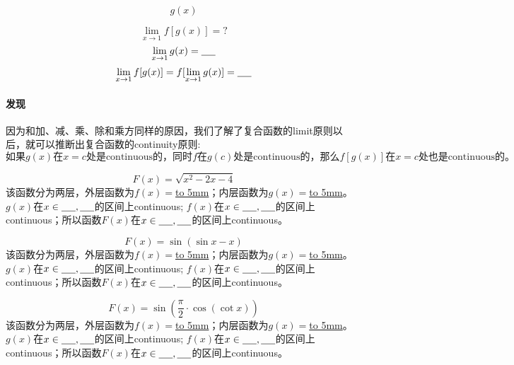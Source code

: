 \documentclass[UTF8]{ctexart}
\begin{document}
\begin{center}
\[g(x)\]
\end{center}

\[{\lim_{x \to 1} f[g(x)]} = ?\]
\[{\lim_{x \to 1} g(x) = \underline{\hbox to 5mm{}}}\]
\[{\lim_{x \to 1} f[g(x)]} = f[{\lim_{x \to 1} g(x)}] = \underline{\hbox to 5mm{}}\]

\paragraph{发现}
因为和加、减、乘、除和乘方同样的原因，我们了解了复合函数的limit原则以后，就可以推断出复合函数的continuity原则:
\[\text{如果} g(x)\text{在}x = c\text{处是continuous的，同时}f\text{在}g(c)\text{处是continuous的，那么}f[g(x)]\text{在}x = c\text{处也是continuous的。}\]

\[F(x) = \sqrt{x^2-2x-4}\]
该函数分为两层，外层函数为$f(x) = $\underline{\hbox to 5mm{}}；内层函数为$g(x) = $\underline{\hbox to 5mm{}}。$g(x)$在$x \in \underline{\hbox to 5mm{}},\underline{\hbox to 5mm{}}$的区间上continuous; $f(x)$在$x \in \underline{\hbox to 5mm{}},\underline{\hbox to 5mm{}}$的区间上continuous；所以函数$F(x)$在$x \in \underline{\hbox to 5mm{}},\underline{\hbox to 5mm{}}$的区间上continuous。

 \[F(x) = \sin{(\sin{x} -x)}\]
该函数分为两层，外层函数为$f(x) = $\underline{\hbox to 5mm{}}；内层函数为$g(x) = $\underline{\hbox to 5mm{}}。$g(x)$在$x \in \underline{\hbox to 5mm{}},\underline{\hbox to 5mm{}}$的区间上continuous; $f(x)$在$x \in \underline{\hbox to 5mm{}},\underline{\hbox to 5mm{}}$的区间上continuous；所以函数$F(x)$在$x \in \underline{\hbox to 5mm{}},\underline{\hbox to 5mm{}}$的区间上continuous。

\[F(x) = \sin{(\frac{\pi}{2} \cdot \cos{(\cot{x})})}\]
该函数分为两层，外层函数为$f(x) = $\underline{\hbox to 5mm{}}；内层函数为$g(x) = $\underline{\hbox to 5mm{}}。$g(x)$在$x \in \underline{\hbox to 5mm{}},\underline{\hbox to 5mm{}}$的区间上continuous; $f(x)$在$x \in \underline{\hbox to 5mm{}},\underline{\hbox to 5mm{}}$的区间上continuous；所以函数$F(x)$在$x \in \underline{\hbox to 5mm{}},\underline{\hbox to 5mm{}}$的区间上continuous。
\end{document}
